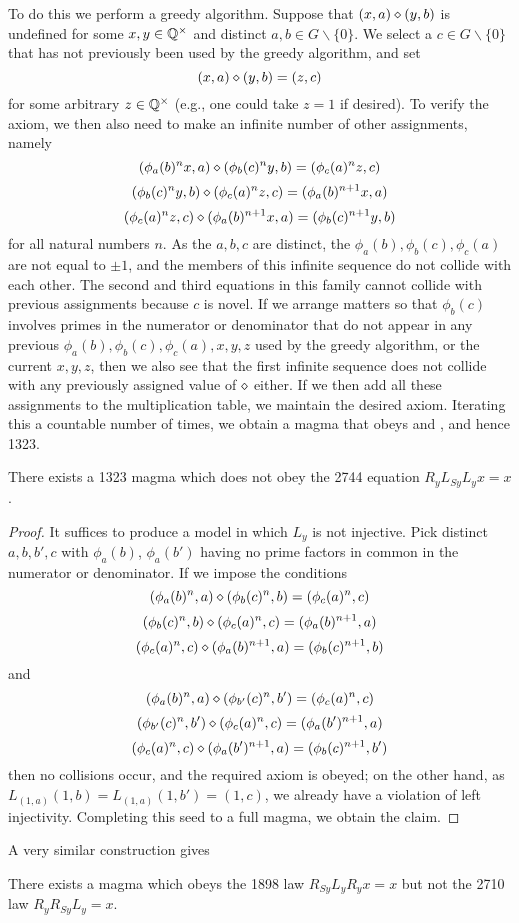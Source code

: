 To do this we perform a greedy algorithm.  Suppose that $(x,a) \diamond (y,b)$ is undefined for some $x,y \in \mathbb{Q}^\times$ and distinct $a,b \in G \backslash \{0\}$.  We select a $c \in G \backslash \{0\}$ that has not previously been used by the greedy algorithm, and set
$$ (x,a) \diamond (y,b) = (z,c)$$
for some arbitrary $z \in \mathbb{Q}^\times$ (e.g., one could take $z=1$ if desired).  To verify the axiom, we then also need to make an infinite number of other assignments, namely
$$ (\phi_a(b)^n x,a) \diamond (\phi_b(c)^n y,b) = (\phi_c(a)^n z,c)$$
$$ (\phi_b(c)^n y,b) \diamond (\phi_c(a)^n z,c) = (\phi_a(b)^{n+1} x, a)$$
$$ (\phi_c(a)^n z,c) \diamond (\phi_a(b)^{n+1} x, a) = (\phi_b(c)^{n+1} y,b)$$
for all natural numbers $n$.  As the $a,b,c$ are distinct, the $\phi_a(b), \phi_b(c), \phi_c(a)$ are not equal to $\pm 1$, and the members of this infinite sequence do not collide with each other.  The second and third equations in this family cannot collide with previous assignments because $c$ is novel.  If we arrange matters so that $\phi_b(c)$ involves primes in the numerator or denominator that do not appear in any previous $\phi_a(b), \phi_b(c), \phi_c(a), x, y, z$ used by the greedy algorithm, or the current $x,y,z$, then we also see that the first infinite sequence does not collide with any previously assigned value of $\diamond$ either.  If we then add all these assignments to the multiplication table, we maintain the desired axiom.  Iterating this a countable number of times, we obtain a magma that obeys  and , and hence 1323.

\begin{corollary}\label{1323-refute-2744}  There exists a 1323 magma which does not obey the 2744 equation $R_y L_{Sy} L_y x = x$.
\end{corollary}

\begin{proof} It suffices to produce a model in which $L_y$ is not injective. Pick distinct $a, b, b', c$ with $\phi_a(b)$, $\phi_a(b')$ having no prime factors in common in the numerator or denominator.  If we impose the conditions
$$ (\phi_a(b)^n,a) \diamond (\phi_b(c)^n,b) = (\phi_c(a)^n,c)$$
$$ (\phi_b(c)^n,b) \diamond (\phi_c(a)^n,c) = (\phi_a(b)^{n+1}, a)$$
$$ (\phi_c(a)^n,c) \diamond (\phi_a(b)^{n+1}, a) = (\phi_b(c)^{n+1},b)$$
and
$$ (\phi_a(b)^n,a) \diamond (\phi_{b'}(c)^n,b') = (\phi_c(a)^n,c)$$
$$ (\phi_{b'}(c)^n,b') \diamond (\phi_c(a)^n,c) = (\phi_a(b')^{n+1}, a)$$
$$ (\phi_c(a)^n,c) \diamond (\phi_{a}(b')^{n+1}, a) = (\phi_b(c)^{n+1},b')$$
then no collisions occur, and the required axiom is obeyed; on the other hand, as $L_{(1,a)} (1,b) = L_{(1,a)} (1,b') = (1,c)$, we already have a violation of left injectivity.  Completing this seed to a full magma, we obtain the claim.
\end{proof}

A very similar construction gives

\begin{corollary}\label{1898-refute-1729}  There exists a magma which obeys the 1898 law $R_{Sy} L_y R_y x = x$ but not the 2710 law $R_y R_{Sy} L_y = x$.
\end{corollary}
